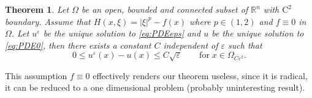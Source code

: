 \documentclass[11pt,reqno]{amsart}
\numberwithin{figure}{section}
\theoremstyle{plain}
\newtheorem{thm}{Theorem}[section]
\theoremstyle{remark}
\numberwithin{equation}{section}
\newcommand{\R}{\mathbb{R}}
\begin{document}
\begin{thm}\label{thm:rate_doubling0} Let $\Omega$ be an open, bounded and connected subset of $\R^n$ with $\mathrm{C}^2$ boundary. Assume that $H(x,\xi) = |\xi|^p - f(x)$ where $p\in\left(1,2\right)$ and $f\equiv 0$ in $\Omega$. Let $u^\varepsilon$ be the unique solution to \eqref{eq:PDEeps} and $u$ be the unique solution to \eqref{eq:PDE0}, then there exists a constant $C$ independent of $\varepsilon$ such that
\begin{equation*}
    0\leq u^\varepsilon(x) - u(x) \leq C\sqrt{\varepsilon} \qquad\text{for}\;x\in \Omega_{C\varepsilon^2}.
\end{equation*}
\end{thm}
\color{blue}
This assumption $f\equiv 0$ effectively renders our theorem useless, since it is radical, it can be reduced to a one dimensional problem (probably uninteresting result).
\color{black}
\end{document}
